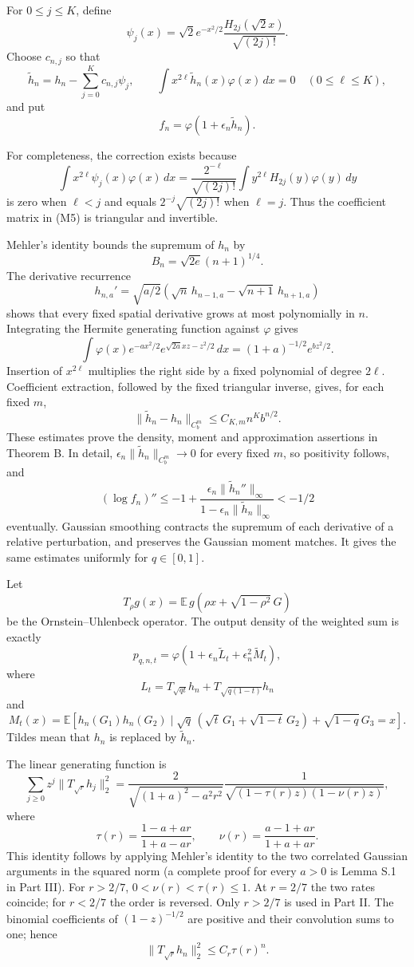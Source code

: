\documentclass[
  british,
  10pt,
]{article}
\begin{document}
For \(0\le j\le K\), define \[
\psi_j(x)=\sqrt2e^{-x^2/2}
          \frac{H_{2j}(\sqrt2x)}{\sqrt{(2j)!}}.
\] Choose \(c_{n,j}\) so that \[
\widetilde h_n=h_n-\sum_{j=0}^Kc_{n,j}\psi_j,\qquad
\int x^{2\ell}\widetilde h_n(x)\varphi(x)\,dx=0
\quad(0\le\ell\le K),
\tag{M5}
\] and put \[
f_n=\varphi(1+\epsilon_n\widetilde h_n).
\tag{M6}
\]

For completeness, the correction exists because \[
\int x^{2\ell}\psi_j(x)\varphi(x)\,dx
=\frac{2^{-\ell}}{\sqrt{(2j)!}}
  \int y^{2\ell}H_{2j}(y)\varphi(y)\,dy
\] is zero when \(\ell<j\) and equals \(2^{-j}\sqrt{(2j)!}\) when
\(\ell=j\). Thus the coefficient matrix in (M5) is triangular and
invertible.

Mehler's identity bounds the supremum of \(h_n\) by \[
B_n=\sqrt{2e}(n+1)^{1/4}.
\] The derivative recurrence \[
h_{n,a}'=\sqrt{a/2}
 \left(\sqrt n\,h_{n-1,a}-\sqrt{n+1}\,h_{n+1,a}\right)
\tag{M7}
\] shows that every fixed spatial derivative grows at most polynomially
in \(n\). Integrating the Hermite generating function against
\(\varphi\) gives \[
\int\varphi(x)e^{-ax^2/2}
 e^{\sqrt{2a}xz-z^2/2}\,dx
=(1+a)^{-1/2}e^{bz^2/2}.
\] Insertion of \(x^{2\ell}\) multiplies the right side by a fixed
polynomial of degree \(2\ell\). Coefficient extraction, followed by the
fixed triangular inverse, gives, for each fixed \(m\), \[
\|\widetilde h_n-h_n\|_{C_b^m}
\le C_{K,m}n^K b^{n/2}.
\tag{M8}
\] These estimates prove the density, moment and approximation
assertions in Theorem B. In detail,
\(\epsilon_n\|\widetilde h_n\|_{C_b^m}\to0\) for every fixed \(m\), so
positivity follows, and \[
(\log f_n)''
\le -1+\frac{\epsilon_n\|\widetilde h_n''\|_\infty}
              {1-\epsilon_n\|\widetilde h_n\|_\infty}
<-1/2
\] eventually. Gaussian smoothing contracts the supremum of each
derivative of a relative perturbation, and preserves the Gaussian moment
matches. It gives the same estimates uniformly for \(q\in[0,1]\).

Let \[
T_\rho g(x)=\mathbb E\,g(\rho x+\sqrt{1-\rho^2}\,G)
\] be the Ornstein--Uhlenbeck operator. The output density of the
weighted sum is exactly \[
p_{q,n,t}
=\varphi(1+\epsilon_n\widetilde L_t+\epsilon_n^2\widetilde M_t),
\tag{M9}
\] where \[
L_t=T_{\sqrt{qt}}h_n+T_{\sqrt{q(1-t)}}h_n
\] and \[
M_t(x)=\mathbb E\left[
h_n(G_1)h_n(G_2)\mid
\sqrt q\,(\sqrt t\,G_1+\sqrt{1-t}\,G_2)
+\sqrt{1-q}\,G_3=x\right].
\tag{M10}
\] Tildes mean that \(h_n\) is replaced by \(\widetilde h_n\).

The linear generating function is \[
\sum_{j\ge0}z^j\|T_{\sqrt r}h_j\|_2^2
=\frac{2}
{\sqrt{(1+a)^2-a^2r^2}}
\frac1{\sqrt{(1-\tau(r)z)(1-\nu(r)z)}},
\tag{M11}
\] where \[
\tau(r)=\frac{1-a+ar}{1+a-ar},\qquad
\nu(r)=\frac{a-1+ar}{1+a+ar}.
\] This identity follows by applying Mehler's identity to the two
correlated Gaussian arguments in the squared norm (a complete proof for
every \(a>0\) is Lemma S.1 in Part III). For \(r>2/7\),
\(0<\nu(r)<\tau(r)\le1\). At \(r=2/7\) the two rates coincide; for
\(r<2/7\) the order is reversed. Only \(r>2/7\) is used in Part II. The
binomial coefficients of \((1-z)^{-1/2}\) are positive and their
convolution sums to one; hence \[
\|T_{\sqrt r}h_n\|_2^2\le C_r\tau(r)^n.
\tag{M12}
\]
\end{document}
